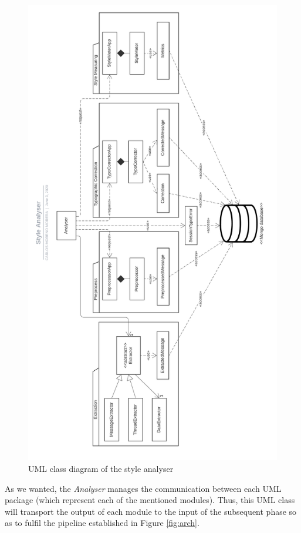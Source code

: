 \begin{figure}[p]
	\centering%
	\includegraphics[height=0.85\paperheight]{Imagenes/Bitmap/StyleAnalyserUML.png}%
	\caption{UML class diagram of the style analyser}%
	\label{fig:umlarch}
\end{figure}

As we wanted, the \textit{Analyser} manages the communication between each UML package (which represent each of the mentioned modules). Thus, this UML class will transport the output of each module to the input of the subsequent phase so as to fulfil the pipeline established in Figure \ref{fig:arch}.

